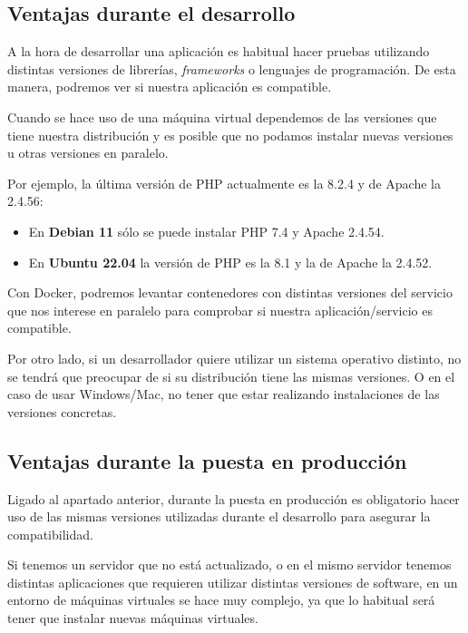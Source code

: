 \subsection{Ventajas durante el desarrollo}

A la hora de desarrollar una aplicación es habitual hacer pruebas utilizando distintas versiones de librerías, \textit{frameworks} o lenguajes de programación. De esta manera, podremos ver si nuestra aplicación es compatible.

Cuando se hace uso de una máquina virtual dependemos de las versiones que tiene nuestra distribución y es posible que no podamos instalar nuevas versiones u otras versiones en paralelo.

Por ejemplo, la última versión de PHP actualmente es la 8.2.4 y de Apache la 2.4.56:

\begin{itemize}
    \item En\textbf{ Debian 11} sólo se puede instalar PHP 7.4 y Apache 2.4.54.
    \item En \textbf{Ubuntu 22.04} la versión de PHP es la 8.1 y la de Apache la 2.4.52.
\end{itemize}

Con Docker, podremos levantar contenedores con distintas versiones del servicio que nos interese en paralelo para comprobar si nuestra aplicación/servicio es compatible.


Por otro lado, si un desarrollador quiere utilizar un sistema operativo distinto, no se tendrá que preocupar de si su distribución tiene las mismas versiones. O en el caso de usar Windows/Mac, no tener que estar realizando instalaciones de las versiones concretas.


\subsection{Ventajas durante la puesta en producción}
Ligado al apartado anterior, durante la puesta en producción es obligatorio hacer uso de las mismas versiones utilizadas durante el desarrollo para asegurar la compatibilidad.


Si tenemos un servidor que no está actualizado, o en el mismo servidor tenemos distintas aplicaciones que requieren utilizar distintas versiones de software, en un entorno de máquinas virtuales se hace muy complejo, ya que lo habitual será tener que instalar nuevas máquinas virtuales.

